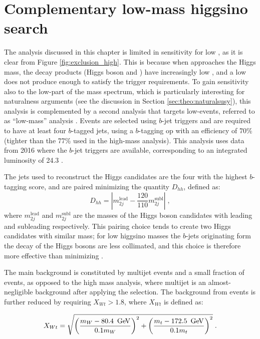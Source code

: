 \section{Complementary low-mass higgsino search}
\label{sec:ewk:LM}

The analysis discussed in this chapter is limited in sensitivity for low \mhino, as it is clear from Figure \ref{fig:exclusion_high}. 
This is because when \mhino approaches the Higgs mass, the decay products (Higgs boson and \gravino)
have increasingly low \pt, and a low \pt \gravino does not produce enough \met to satisfy the \met trigger requirements.  
To gain sensitivity also to the low-\mhino part of the mass spectrum, which is particularly interesting for naturalness arguments (see the 
discussion in Section \ref{sec:theo:naturalsusy}), 
this analysis is complemented by a second analysis that targets low-\met events, referred to as ``low-mass'' analysis \cite{Aaboud:2018htj}. 
Events are selected using $b$-jet triggers and are required to have at least four $b$-tagged jets, 
using a $b$-tagging \gls{op} with an efficiency of 70\%
(tighter than the 77\% used in the high-mass analysis).
This analysis uses data from 2016 where the $b$-jet triggers are available, corresponding to an integrated luminosity of 24.3 \ifb.

The jets used to reconstruct the Higgs candidates are the four with the highest $b$-tagging score, and are paired minimizing the quantity 
$D_{hh}$, defined as:
\begin{equation}
  D_{hh} = \left|m_{2j}^\textrm{lead} - \frac{120}{110}m_{2j}^\textrm{subl}\right| \; , \nonumber
\end{equation}
where $m_{2j}^\textrm{lead}$ and $m_{2j}^\textrm{subl}$ are the masses of the Higgs boson candidates with leading and subleading \pt respectively.
This pairing choice tends to create two Higgs candidates with similar mass; 
for low higgsino masses the $b$-jets originating form the decay of the Higgs bosons are less collimated, 
and this choice is therefore more effective than minimizing \dRmax. 

The main background is constituted by multijet events and a small fraction of \ttbar events, as opposed to the
high mass analysis, where multijet is an almost-negligible background after applying the \dphimin selection. 
The background from \ttbar events is further reduced by requiring $X_{Wt}>1.8$, where $X_{Wt}$ is defined as:

\begin{equation}
 X_{Wt} = \sqrt{\left( \frac{m_W - 80.4\,\ \gev}{0.1  m_W} \right)^2 + \left( \frac{m_t - 172.5\,\ \gev}{0.1  m_t} \right)^2 } \;. \nonumber
\end{equation}

